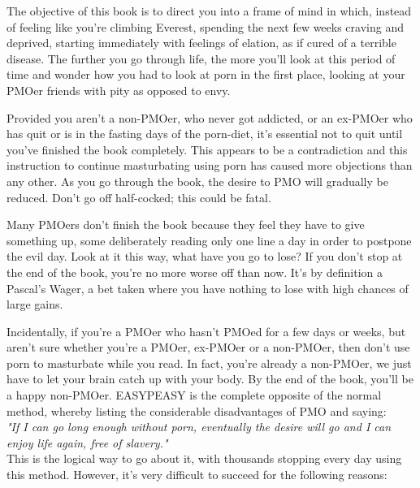 \documentclass[easypeasy.tex]{subfiles}
\begin{document}
The objective of this book is to direct you into a frame of mind in which, instead of feeling like you're climbing Everest, spending the next few weeks craving and deprived, starting immediately with feelings of elation, as if cured of a terrible disease. The further you go through life, the more you'll look at this period of time and wonder how you had to look at porn in the first place, looking at your PMOer friends with pity as opposed to envy.

Provided you aren't a non-PMOer, who never got addicted, or an ex-PMOer who has quit or is in the fasting days of the porn-diet, it's essential not to quit until you've finished the book completely. This appears to be a contradiction and this instruction to continue masturbating using porn has caused more objections than any other. As you go through the book, the desire to PMO will gradually be reduced. Don't go off half-cocked; this could be fatal.

Many PMOers don't finish the book because they feel they have to give something up, some deliberately reading only one line a day in order to postpone the evil day. Look at it this way, what have you go to lose? If you don't stop at the end of the book, you're no more worse off than now. It's by definition a Pascal's Wager, a bet taken where you have nothing to lose with high chances of large gains.

Incidentally, if you're a PMOer who hasn't PMOed for a few days or weeks, but aren't sure whether you're a PMOer, ex-PMOer or a non-PMOer, then don't use porn to masturbate while you read. In fact, you're already a non-PMOer, we just have to let your brain catch up with your body. By the end of the book, you'll be a happy non-PMOer. EASYPEASY is the complete opposite of the normal method, whereby listing the considerable disadvantages of PMO and saying:\\
\textit{"If I can go long enough without porn, eventually the desire will go and I can enjoy life again, free of slavery."}\\
This is the logical way to go about it, with thousands stopping every day using this method. However, it's very difficult to succeed for the following reasons:
\end{document}
